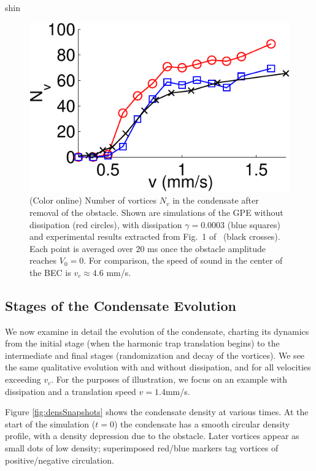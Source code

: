 \begin{chapter}{\label{cha:shin}shin}
\begin{figure}
\begin{minipage}{0.5\textwidth}
\centering
\includegraphics[width=0.9\linewidth]{shin/fig1}
\end{minipage} \hfill
\begin{minipage}{0.5\textwidth}
\caption{\label{fig:N_vV} (Color online) Number of vortices $N_v$ in the condensate after removal of the obstacle. Shown are simulations of the GPE without dissipation (red circles), with dissipation $\gamma = 0.0003$ (blue squares) and experimental results extracted from Fig.~1 of~\citep{kwon_moon_14} (black crosses). Each point is averaged over $20$ ms once the obstacle amplitude reaches $V_0=0$.  For comparison, the speed of sound in the center of the BEC is $v_c\approx 4.6$ mm/s.  }
\end{minipage} \hfill
\end{figure}

\subsection{Stages of the Condensate Evolution}

We now examine in detail the evolution of the condensate, 
charting its dynamics from the initial stage (when the
harmonic trap translation begins) to the intermediate and final stages 
(randomization and decay of the vortices).  We see the same 
qualitative evolution with and without dissipation, and for all 
velocities exceeding $v_c$.  For the purposes of illustration, 
we focus on an example with dissipation and a translation 
speed $v=1.4$mm/s. 


Figure \ref{fig:densSnapshots} shows the condensate density at various times. At the start of the simulation ($t=0$) the condensate has a smooth circular density profile, with a density depression due to the obstacle.  Later vortices appear as small dots of low density; superimposed red/blue markers tag vortices of positive/negative circulation.


\end{chapter}
